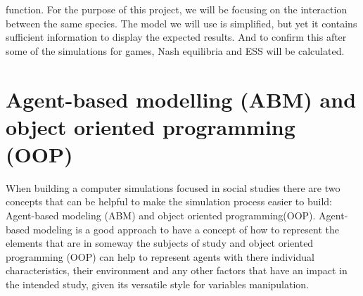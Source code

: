 function. For the purpose of this project, we will be focusing on the interaction between the same species. The model we will use is simplified, but yet it contains sufficient information to display the expected results. And to confirm this after some of the simulations for games, Nash equilibria and ESS will be calculated.

\section{Agent-based modelling (ABM) and object oriented programming (OOP)} \label{ABM}
When building a computer simulations focused in social studies there are two concepts that can be helpful to make the simulation process easier to build: Agent-based modeling (ABM) and object oriented programming(OOP). Agent-based modeling is a good approach to have a concept of how to represent the elements that are in someway the subjects of study and object oriented programming (OOP) can help to represent agents with there individual characteristics, their environment and any other factors that have an impact in the intended study, given its versatile style for variables manipulation.
